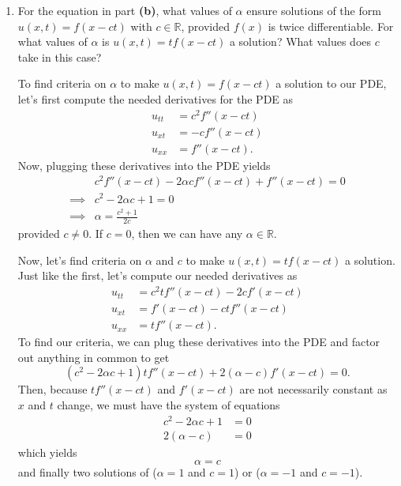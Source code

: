 \documentclass[a4paper,12pt]{article}
\newcommand{\reals}{\mathbb{R}}
\begin{document}
\begin{enumerate}[label = \textbf{(\alph*)}]
            \item For the equation in part \textbf{(b)}, what values of $ \alpha $ ensure solutions of the form $ u(x,t) = f(x - ct) $ with $ c \in \reals $, provided $ f(x) $ is twice differentiable. For what values of $ \alpha $ is $ u(x,t) = t f(x - ct) $ a solution? What values does $ c $ take in this case?
            
            To find criteria on $ \alpha $ to make $ u(x,t) = f(x - ct) $ a solution to our PDE, let's first compute the needed derivatives for the PDE as
            \begin{align*}
                u_{tt} &= c^2 f''(x - ct) \\
                u_{xt} &= -c f''(x - ct) \\
                u_{xx} &= f''(x - ct). 
            \end{align*}
            Now, plugging these derivatives into the PDE yields
            \begin{align*}
                & c^2 f''(x - ct) - 2 \alpha c f''(x - ct) + f''(x - ct) = 0 \\
                \implies & c^2 - 2 \alpha c + 1 = 0 \\
                \implies & \alpha = \frac{c^2 + 1}{2c}
            \end{align*}
            provided $ c \neq 0 $. If $ c = 0 $, then we can have any $ \alpha \in \reals $.
            
            Now, let's find criteria on $ \alpha $ and $ c $ to make $ u(x,t) = t f(x - ct) $ a solution. Just like the first, let's compute our needed derivatives as
            \begin{align*}
                u_{tt} &= c^2 t f''(x - ct) - 2c f'(x - ct) \\
                u_{xt} &= f'(x - ct) - c t f''(x - ct) \\
                u_{xx} &= t f''(x - ct). 
            \end{align*}
            To find our criteria, we can plug these derivatives into the PDE and factor out anything in common to get
            \[
                (c^2 - 2 \alpha c + 1) t f''(x - ct) + 2(\alpha - c) f'(x - ct) = 0.
            \]
            Then, because $ t f''(x - ct) $ and $ f'(x - ct) $ are not necessarily constant as $ x $ and $ t $ change, we must have the system of equations
            \begin{align*}
                c^2 - 2 \alpha c + 1 &= 0 \\
                2(\alpha - c) &= 0
            \end{align*}
            which yields
            \[
                \alpha = c
            \]
            and finally two solutions of ($ \alpha = 1 $ and $ c = 1 $) or ($ \alpha = -1 $ and $ c = -1 $).
            

\end{enumerate}
\end{document}
